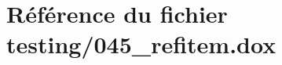 \hypertarget{045__refitem_8dox}{}\section{Référence du fichier testing/045\+\_\+refitem.dox}
\label{045__refitem_8dox}
